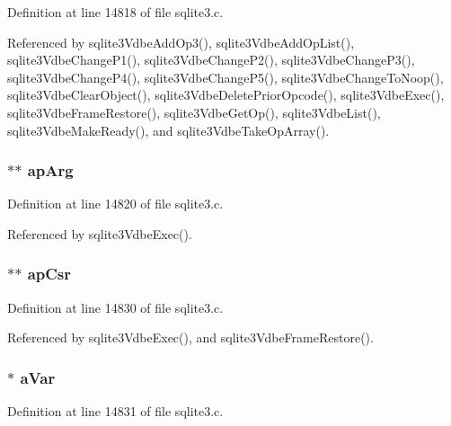 Definition at line 14818 of file sqlite3.\+c.



Referenced by sqlite3\+Vdbe\+Add\+Op3(), sqlite3\+Vdbe\+Add\+Op\+List(), sqlite3\+Vdbe\+Change\+P1(), sqlite3\+Vdbe\+Change\+P2(), sqlite3\+Vdbe\+Change\+P3(), sqlite3\+Vdbe\+Change\+P4(), sqlite3\+Vdbe\+Change\+P5(), sqlite3\+Vdbe\+Change\+To\+Noop(), sqlite3\+Vdbe\+Clear\+Object(), sqlite3\+Vdbe\+Delete\+Prior\+Opcode(), sqlite3\+Vdbe\+Exec(), sqlite3\+Vdbe\+Frame\+Restore(), sqlite3\+Vdbe\+Get\+Op(), sqlite3\+Vdbe\+List(), sqlite3\+Vdbe\+Make\+Ready(), and sqlite3\+Vdbe\+Take\+Op\+Array().

\hypertarget{struct_vdbe_a5af1ceadb4cb7bde73c69b7f51a626bc}{}
\subsubsection[{ap\+Arg}]{$\ast$$\ast$ ap\+Arg}\label{struct_vdbe_a5af1ceadb4cb7bde73c69b7f51a626bc}


Definition at line 14820 of file sqlite3.\+c.



Referenced by sqlite3\+Vdbe\+Exec().

\hypertarget{struct_vdbe_ac1dd9d69a090bcc1bdb7afa3b0525eea}{}
\subsubsection[{ap\+Csr}]{$\ast$$\ast$ ap\+Csr}\label{struct_vdbe_ac1dd9d69a090bcc1bdb7afa3b0525eea}


Definition at line 14830 of file sqlite3.\+c.



Referenced by sqlite3\+Vdbe\+Exec(), and sqlite3\+Vdbe\+Frame\+Restore().

\hypertarget{struct_vdbe_ab72ee9a683e5486c32c8166cb369c222}{}
\subsubsection[{a\+Var}]{$\ast$ a\+Var}\label{struct_vdbe_ab72ee9a683e5486c32c8166cb369c222}


Definition at line 14831 of file sqlite3.\+c.



